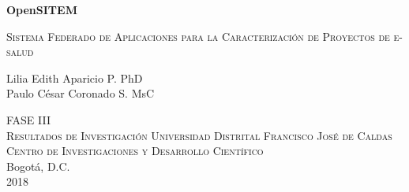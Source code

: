 \documentclass[11pt]{report}
\begin{document}
\begin{titlepage}
	\centering
	{\huge\bfseries OpenSITEM\par}
	{\scshape\Large Sistema Federado de Aplicaciones para la Caracterización de Proyectos de e-salud\par}
	\vfill
	{\Large Lilia Edith Aparicio P. PhD\\Paulo César Coronado S. MsC \par}
	\vspace{2cm}
	{\scshape\Large FASE III\\Resultados de Investigación}	
	\vfill
	{\scshape Universidad Distrital Francisco José de Caldas\\Centro de Investigaciones y Desarrollo Científico\\}
	{\large Bogotá, D.C.\\2018}
\end{titlepage}
%

\renewcommand{\tablename}{Tabla}
\renewcommand{\listtablename}{Índice de tablas}
\renewcommand{\appendixname}{Anexo}
\tableofcontents







\begin{appendices}










\end{appendices}
\end{document}
